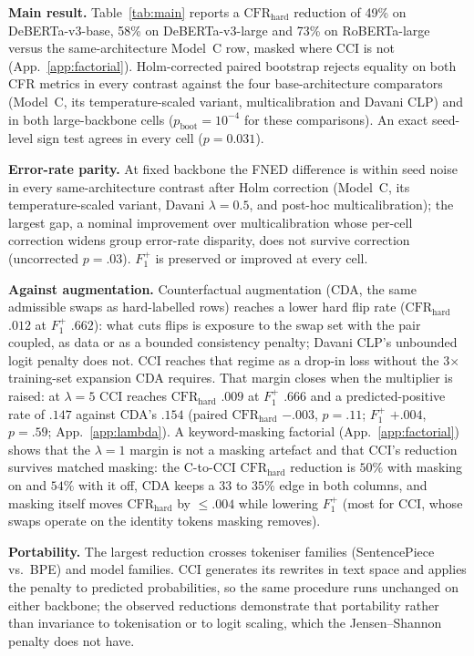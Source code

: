 \documentclass[11pt]{article}
\newcommand{\Fpos}{\ensuremath{F_1^{+}}\xspace}
\newcommand{\CFRh}{\ensuremath{\mathrm{CFR}_{\mathrm{hard}}}\xspace}
\begin{document}
\begin{table}[t]
\label{tab:main}
\end{table}

\textbf{Main result.} Table~\ref{tab:main} reports a \CFRh{} reduction of 49\% on DeBERTa-v3-base, 58\% on DeBERTa-v3-large and 73\% on RoBERTa-large versus the same-architecture Model~C row, masked where CCI is not (App.~\ref{app:factorial}). Holm-corrected paired bootstrap rejects equality on both CFR metrics in every contrast against the four base-architecture comparators (Model~C, its temperature-scaled variant, multicalibration and Davani CLP) and in both large-backbone cells ($p_{\mathrm{boot}}{=}10^{-4}$ for these comparisons). An exact seed-level sign test agrees in every cell ($p{=}0.031$).

\textbf{Error-rate parity.} At fixed backbone the FNED difference is within seed noise in every same-architecture contrast after Holm correction (Model~C, its temperature-scaled variant, Davani $\lambda{=}0.5$, and post-hoc multicalibration); the largest gap, a nominal improvement over multicalibration whose per-cell correction widens group error-rate disparity, does not survive correction (uncorrected $p{=}.03$). \Fpos{} is preserved or improved at every cell.

\textbf{Against augmentation.} Counterfactual augmentation (CDA, the same admissible swaps as hard-labelled rows) reaches a lower hard flip rate (\CFRh{} $.012$ at \Fpos{} $.662$): what cuts flips is exposure to the swap set with the pair coupled, as data or as a bounded consistency penalty; Davani CLP's unbounded logit penalty does not. CCI reaches that regime as a drop-in loss without the 3$\times$ training-set expansion CDA requires. That margin closes when the multiplier is raised: at $\lambda{=}5$ CCI reaches \CFRh{} $.009$ at \Fpos{} $.666$ and a predicted-positive rate of $.147$ against CDA's $.154$ (paired \CFRh{} $-.003$, $p{=}.11$; \Fpos{} $+.004$, $p{=}.59$; App.~\ref{app:lambda}). A keyword-masking factorial (App.~\ref{app:factorial}) shows that the $\lambda{=}1$ margin is not a masking artefact and that CCI's reduction survives matched masking: the C-to-CCI \CFRh{} reduction is $50\%$ with masking on and $54\%$ with it off, CDA keeps a $33$ to $35\%$ edge in both columns, and masking itself moves \CFRh{} by $\le.004$ while lowering \Fpos{} (most for CCI, whose swaps operate on the identity tokens masking removes). 

\textbf{Portability.} The largest reduction crosses tokeniser families (SentencePiece vs.\ BPE) and model families. CCI generates its rewrites in text space and applies the penalty to predicted probabilities, so the same procedure runs unchanged on either backbone; the observed reductions demonstrate that portability rather than invariance to tokenisation or to logit scaling, which the Jensen--Shannon penalty does not have.
\end{document}
